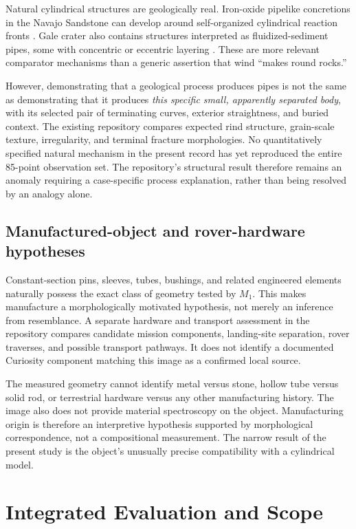 \documentclass[11pt,letterpaper]{article}
\begin{document}
Natural cylindrical structures are geologically real. Iron-oxide pipelike concretions in the Navajo Sandstone can develop around self-organized cylindrical reaction fronts \cite{loope2011}. Gale crater also contains structures interpreted as fluidized-sediment pipes, some with concentric or eccentric layering \cite{rubin2017}. These are more relevant comparator mechanisms than a generic assertion that wind ``makes round rocks.''

However, demonstrating that a geological process produces pipes is not the same as demonstrating that it produces \emph{this specific small, apparently separated body}, with its selected pair of terminating curves, exterior straightness, and buried context. The existing repository compares expected rind structure, grain-scale texture, irregularity, and terminal fracture morphologies. No quantitatively specified natural mechanism in the present record has yet reproduced the entire 85-point observation set. The repository's structural result therefore remains an anomaly requiring a case-specific process explanation, rather than being resolved by an analogy alone.

\subsection{Manufactured-object and rover-hardware hypotheses}

Constant-section pins, sleeves, tubes, bushings, and related engineered elements naturally possess the exact class of geometry tested by \(M_1\). This makes manufacture a morphologically motivated hypothesis, not merely an inference from resemblance. A separate hardware and transport assessment in the repository compares candidate mission components, landing-site separation, rover traverses, and possible transport pathways. It does not identify a documented Curiosity component matching this image as a confirmed local source.

The measured geometry cannot identify metal versus stone, hollow tube versus solid rod, or terrestrial hardware versus any other manufacturing history. The image also does not provide material spectroscopy on the object. Manufacturing origin is therefore an interpretive hypothesis supported by morphological correspondence, not a compositional measurement. The narrow result of the present study is the object's unusually precise compatibility with a cylindrical model.

\section{Integrated Evaluation and Scope}
\label{sec:discussion}
\end{document}
